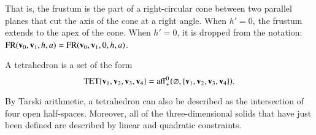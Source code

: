 That is, the frustum is the part of a right-circular cone between two
parallel planes that cut the axis of the cone at a right angle.  When
$h'=0$, the frustum extends to the apex of the cone.  When $h'=0$, it
is dropped from the notation:
${\operatorname{FR}}({\mathbf v}_0,{\mathbf v}_1,h,a)={\operatorname{FR}}({\mathbf v}_0,{\mathbf v}_1,0,h,a)$.

%

\begin{definition}[tetrahedron]
 A tetrahedron is a set of the form
\[ {\operatorname{TET}}\{{\mathbf v}_1,{\mathbf v}_2,{\mathbf v}_3,{\mathbf v}_4\} = 
{\operatorname{aff}}^0_+(\varnothing,\{{\mathbf v}_1,{\mathbf v}_2,{\mathbf v}_3,{\mathbf v}_4\}).\] 
%
\end{definition}

\begin{remark}
  By Tarski arithmetic, %
  a tetrahedron can also be described as the intersection of four open
  half-spaces. Moreover,  all of
  the three-dimensional solids that have just been defined are
  described by linear and quadratic constraints.  %
\end{remark}

%

